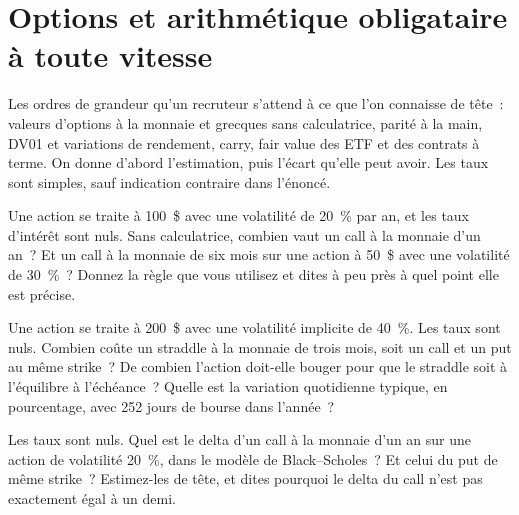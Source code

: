 \chapter{Options et arithmétique obligataire à toute vitesse}\label{ch:iv2:options-and-bond-arithmetic-at-speed}

\begin{ivtrains}
Les ordres de grandeur qu'un recruteur s'attend à ce que l'on connaisse de tête~: valeurs d'options à la monnaie et grecques sans calculatrice, parité à la main, DV01 et variations de rendement, carry, fair value des ETF et des contrats à terme. On donne d'abord l'estimation, puis l'écart qu'elle peut avoir. Les taux sont simples, sauf indication contraire dans l'énoncé.
\end{ivtrains}

\begin{question}\label{iq:iv2:options-and-bond-arithmetic-at-speed:1}
Une action se traite à 100~\$ avec une volatilité de 20~\% par an, et les taux d'intérêt sont nuls. Sans calculatrice, combien vaut un call à la monnaie d'un an~? Et un call à la monnaie de six mois sur une action à 50~\$ avec une volatilité de 30~\%~? Donnez la règle que vous utilisez et dites à peu près à quel point elle est précise.
\end{question}

\begin{question}\label{iq:iv2:options-and-bond-arithmetic-at-speed:2}
Une action se traite à 200~\$ avec une volatilité implicite de 40~\%. Les taux sont nuls. Combien coûte un straddle à la monnaie de trois mois, soit un call et un put au même strike~? De combien l'action doit-elle bouger pour que le straddle soit à l'équilibre à l'échéance~? Quelle est la variation quotidienne typique, en pourcentage, avec 252 jours de bourse dans l'année~?
\end{question}

\begin{question}\label{iq:iv2:options-and-bond-arithmetic-at-speed:3}
Les taux sont nuls. Quel est le delta d'un call à la monnaie d'un an sur une action de volatilité 20~\%, dans le modèle de Black--Scholes~? Et celui du put de même strike~? Estimez-les de tête, et dites pourquoi le delta du call n'est pas exactement égal à un demi.
\end{question}

